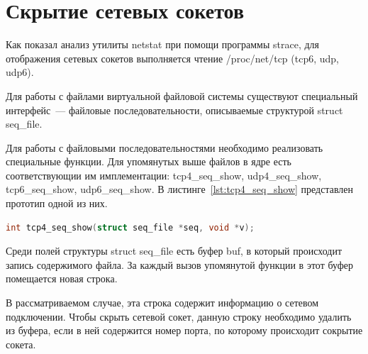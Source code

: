 \section{Скрытие сетевых сокетов}%
\label{sec:skrytie_setevykh_soketov}

Как показал анализ утилиты netstat при помощи программы strace, для отображения сетевых сокетов выполняется чтение /proc/net/tcp (tcp6, udp, udp6).

Для работы с файлами виртуальной файловой системы существуют специальный интерфейс~--- файловые последовательности, описываемые структурой struct seq\_file.

Для работы с файловыми последовательностями необходимо реализовать специальные функции. Для упомянутых выше файлов в ядре есть соответствующии им имплементации: tcp4\_seq\_show, udp4\_seq\_show, tcp6\_seq\_show, udp6\_seq\_show. В листинге~\ref{lst:tcp4_seq_show} представлен прототип одной из них.
\begin{lstlisting}[language=c,caption={Прототип tcp4\_seq\_show},label=lst:tcp4_seq_show]
int tcp4_seq_show(struct seq_file *seq, void *v);
\end{lstlisting}

Среди полей структуры struct seq\_file есть буфер buf, в который происходит запись содержимого файла. За каждый вызов упомянутой функции в этот буфер помещается новая строка.

В рассматриваемом случае, эта строка содержит информацию о сетевом подключении. Чтобы скрыть сетевой сокет, данную строку необходимо удалить из буфера, если в ней содержится номер порта, по которому происходит сокрытие сокета.

